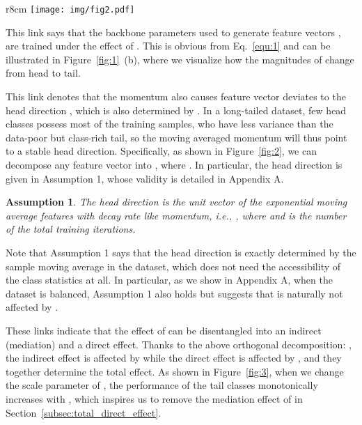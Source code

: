 \documentclass{article}
\newcommand{\ie}{\textit{i.e.}}
\newtheorem{theorem}{Assumption}
\begin{document}
\begin{wrapfigure}{r}{8cm}
\texttt{[image: img/fig2.pdf]}
\vspace{-3mm}
\caption{Based on Assumption 1, the feature vector  can be decomposed into a discriminative feature  and a projection on head direction }
\label{fig:2}
\vspace{-5mm}
\end{wrapfigure}
 This link says that the backbone parameters used to generate feature vectors , are trained under the effect of . This is obvious from Eq.~\eqref{equ:1} and can be illustrated in Figure~\ref{fig:1}~(b), where we visualize how the magnitudes of  change from head to tail. 


 This link denotes that the momentum also causes feature vector  deviates to the head direction , which is also determined by . In a long-tailed dataset, few head classes possess most of the training samples, who have less variance than the data-poor but class-rich tail, so the moving averaged momentum will thus point to a stable head direction. Specifically, as shown in Figure~\ref{fig:2}, we can decompose any feature vector  into , where . In particular, the head direction  is given in Assumption 1, whose validity is detailed in Appendix A.
\begin{theorem}
The head direction  is the unit vector of the exponential moving average features with decay rate  like momentum, \ie, , where  and  is the number of the total training iterations.
\label{assp:1}
\end{theorem}
Note that Assumption 1 says that the head direction is exactly determined by the sample moving average  in the dataset, which does not need the accessibility of the class statistics at all. In particular, as we show in Appendix A, when the dataset is balanced, Assumption 1 also holds but suggests that  is naturally not affected by . 


 These links indicate that the effect of  can be disentangled into an indirect (mediation) and a direct effect. Thanks to the above orthogonal decomposition: , the indirect effect is affected by  while the direct effect is affected by , and they together determine the total effect. As shown in Figure~\ref{fig:3}, when we change the scale parameter  of , the performance of the tail classes monotonically increases with , which inspires us to remove the mediation effect of  in Section~\ref{subsec:total_direct_effect}.
\end{document}
